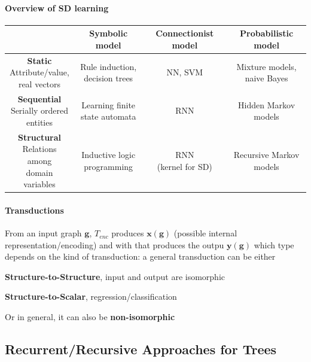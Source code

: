 \documentclass[10pt]{report}
\begin{document}
\paragraph{Overview of SD learning}
\begin{center}
\begin{tabular}{c | c | c | c}
& \textbf{Symbolic model} & \textbf{Connectionist model} & \textbf{Probabilistic model}\\
\hline
\makecell{\textbf{Static}\\Attribute/value,\\real vectors} & \makecell{Rule induction,\\decision trees} & NN, SVM & \makecell{Mixture models,\\naive Bayes}\\
\hline
\makecell{\textbf{Sequential}\\Serially ordered\\entities} & \makecell{Learning finite\\state automata} & RNN & \makecell{Hidden Markov\\models}\\
\hline
\makecell{\textbf{Structural}\\Relations among\\domain variables} & \makecell{Inductive logic\\programming} & \makecell{RNN\\(kernel for SD)} & \makecell{Recursive Markov\\models}
\end{tabular}
\end{center}
\paragraph{Transductions}
From an input graph $\mathbf{g}$, $T_{enc}$ produces $\mathbf{x}(\mathbf{g})$ (possible internal representation/encoding) and with that produces the outpu $\mathbf{y}(\mathbf{g})$ which type depends on the kind of transduction: a general transduction can be either
\begin{list}{}{}
	\item \textbf{Structure-to-Structure}, input and output are isomorphic
	\item \textbf{Structure-to-Scalar}, regression/classification
	\item Or in general, it can also be \textbf{non-isomorphic}
\end{list}
\subsection{Recurrent/Recursive Approaches for Trees}
\end{document}
